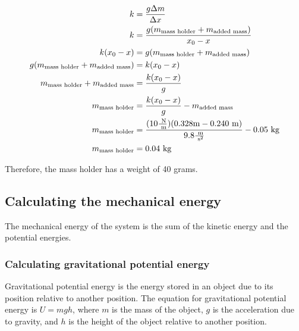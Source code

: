 \documentclass[titlepage]{article}
\begin{document}
            \begin{equation}
                \begin{aligned}
                    \small
                    \notag
                    k &= \frac{g \Delta m}{\Delta x} \\
                    k &= \frac{g (m_{\text{mass holder}} + m_{\text{added mass}})}{x_0-x} \\
                    k(x_0-x) &= g (m_{\text{mass holder}} + m_{\text{added mass}}) \\
                    g(m_{\text{mass holder}} + m_{\text{added mass}}) &= k(x_0-x) \\
                    m_{\text{mass holder}} + m_{\text{added mass}} &= \frac{k(x_0-x)}{g} \\
                    m_{\text{mass holder}} &= \frac{k(x_0-x)}{g} - m_{\text{added mass}} \\
                    m_{\text{mass holder}} &= \frac{(10 \frac{\text{ N}}{\text{ m}})(0.328 \text{m} - 0.240 \text{ m})}{9.8 \frac{\text{ m}}{\text{ s}^2}} - 0.05 \text{ kg} \\
                    m_{\text{mass holder}} &= 0.04 \text{ kg} \\
                \end{aligned}\label{eq:mass-of-mass-holder-with-values}
            \end{equation}
            
            Therefore, the mass holder has a weight of 40 grams.
        
        \subsection{Calculating the mechanical energy}\label{subsec:calculating-the-mechanical-energy}
            The mechanical energy of the system is the sum of the kinetic energy and the potential energies.
            
            \subsubsection{Calculating gravitational potential energy}
                Gravitational potential energy is the energy stored in an object due to its position relative to another position.
                The equation for gravitational potential energy is $U = mgh$, where $m$ is the mass of the object, $g$ is the acceleration due to gravity, and $h$ is the height of the object relative to another position.
                
\end{document}

